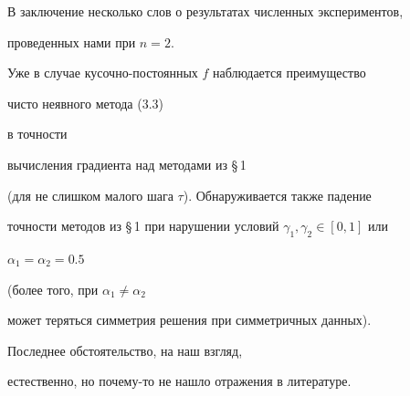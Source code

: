 В заключение несколько слов о результатах численных экспериментов,


проведенных нами при $n=2$.


Уже в случае кусочно-постоянных $f$ наблюдается преимущество 


чисто неявного метода (3.3)


в точности 


вычисления градиента  над методами из \S\,1


(для не слишком малого шага $\tau$). Обнаруживается также падение


точности методов из \S\,1 при нарушении условий $\gamma_1,\gamma_2\in [0,1]$ или 


$\alpha_1=\alpha_2=0.5$


(более того, при $\alpha_1\ne\alpha_2$ 


может теряться симметрия решения при симметричных данных).


Последнее обстоятельство, на наш взгляд,


естественно, но почему-то не нашло отражения в литературе.





